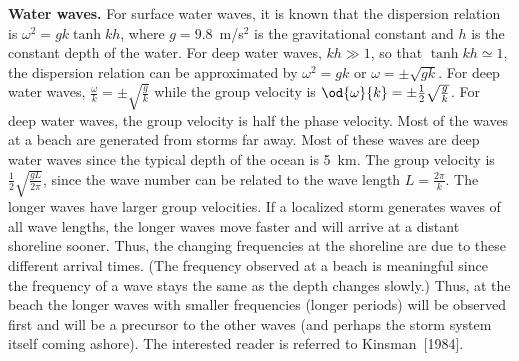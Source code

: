 \textbf{Water waves.}  For surface water waves, it is known that the dispersion relation is $\omega^2 = gk\tanh kh$, where $g = 9.8$~m/s$^2$ is the gravitational constant and $h$ is the constant depth of the water.  For deep water waves, $kh \gg 1$, so that $\tanh kh \simeq 1$, the dispersion relation can be approximated by $\omega^2 = gk$ or $\omega = \pm\sqrt{gk}$.  For deep water waves, $\frac{\omega}{k} = \pm\sqrt{\frac{g}{k}}$ while the group velocity is $\od{\omega}{k} = \pm\frac{1}{2}\sqrt{\frac{g}{k}}$.  For deep water waves, the group velocity is half the phase velocity.  Most of the waves at a beach are generated from storms far away.  Most of these waves are deep water waves since the typical depth of the ocean is 5~km.  The group velocity is $\frac{1}{2}\sqrt{\frac{gL}{2\pi}}$, since the wave number can be related to the wave length $L = \frac{2\pi}{k}$.  The longer waves have larger group velocities.  If a localized storm generates waves of all wave lengths, the longer waves move faster and will arrive at a distant shoreline sooner.  Thus, the changing frequencies at the shoreline are due to these different arrival times.  (The frequency observed at a beach is meaningful since the frequency of a wave stays the same as the depth changes slowly.)  Thus, at the beach the longer waves with smaller frequencies (longer periods) will be observed first and will be a precursor to the other waves (and perhaps the storm system itself coming ashore).  The interested reader is referred to Kinsman~[1984].

